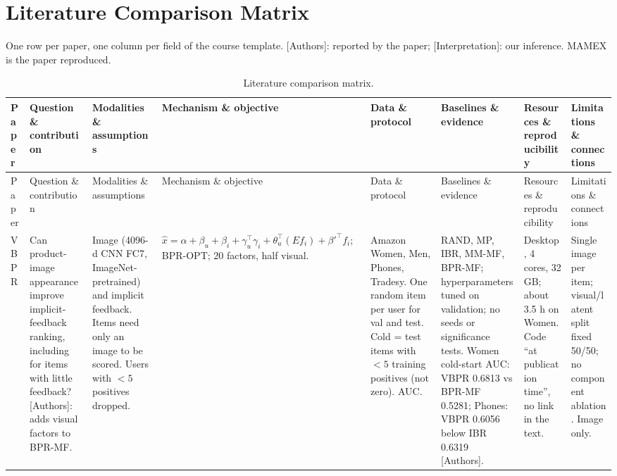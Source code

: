 \documentclass[conference]{IEEEtran}
\begin{document}
\section{Literature Comparison Matrix}
\label{app:matrix}

One row per paper, one column per field of the course template. [Authors]: reported by the paper; [Interpretation]: our inference. MAMEX is the paper reproduced.

\clearpage
\onecolumn
\begingroup\centering\scriptsize\setlength{\tabcolsep}{4pt}
\renewcommand{\arraystretch}{1.1}
\begin{longtable}{@{}p{1.7cm}*{7}{>{\raggedright\arraybackslash}p{2.0cm}}@{}}
\caption{Literature comparison matrix.}\label{tab:matrix}\\
\toprule
Paper & Question \& contribution & Modalities \& assumptions & Mechanism \& objective & Data \& protocol & Baselines \& evidence & Resources \& reproducibility & Limitations \& connections \\
\midrule
\endfirsthead
\toprule
Paper & Question \& contribution & Modalities \& assumptions & Mechanism \& objective & Data \& protocol & Baselines \& evidence & Resources \& reproducibility & Limitations \& connections \\
\midrule
\endhead
\bottomrule
\endfoot
VBPR~\cite{he2016vbpr} & Can product-image appearance improve implicit-feedback ranking, including for items with little feedback? [Authors]: adds visual factors to BPR-MF. & Image (4096-d CNN FC7, ImageNet-pretrained) and implicit feedback. Items need only an image to be scored. Users with $<5$ positives dropped. & $\hat{x} = \alpha + \beta_u + \beta_i + \gamma_u^{\top}\gamma_i + \theta_u^{\top}(E f_i) + \beta'^{\top} f_i$; BPR-OPT; 20 factors, half visual. & Amazon Women, Men, Phones, Tradesy. One random item per user for val and test. Cold = test items with $<5$ training positives (not zero). AUC. & RAND, MP, IBR, MM-MF, BPR-MF; hyperparameters tuned on validation; no seeds or significance tests. Women cold-start AUC: VBPR 0.6813 vs BPR-MF 0.5281; Phones: VBPR 0.6056 below IBR 0.6319 [Authors]. & Desktop, 4 cores, 32 GB; about 3.5 h on Women. Code ``at publication time'', no link in the text. & Single image per item; visual/latent split fixed 50/50; no component ablation. Image only. \\
\midrule

\end{longtable}
\end{document}
